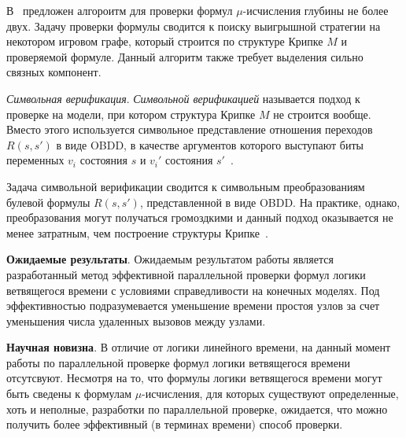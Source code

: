 \documentclass[a4paper,notitlepage,14pt]{article}
\begin{document}
В~\cite{Bollig_localparallel,Leucker_parallelmodel} предложен алгороитм для проверки
формул $\mu$-исчисления глубины не более двух. Задачу проверки формулы сводится к поиску
выигрышной стратегии на некотором игровом графе, который строится по структуре Крипке $M$
и проверяемой формуле. Данный алгоритм также требует выделения сильно связных компонент.

\textit{Символьная верификация}. \emph{Символьной верификацией} называется подход к
проверке на модели, при котором структура Крипке $M$ не строится вообще. Вместо этого
используется символьное представление отношения переходов $R(s, s')$ в виде OBDD, в
качестве аргументов которого выступают биты переменных $v_i$ состояния $s$ и $v_i'$
состояния $s'$~\cite{Clarke}.

Задача символьной верификации сводится к символьным преобразованиям булевой формулы $R(s,
s')$, представленной в виде OBDD. На практике, однако, преобразования могут получаться
громоздкими и данный подход оказывается не менее затратным, чем построение структуры
Крипке~\cite{Stern97parallelizingthe}.


\textbf{Ожидаемые результаты}. Ожидаемым результатом работы является разработанный метод
эффективной параллельной проверки формул логики ветвящегося времени с условиями
справедливости на конечных моделях. Под эффективностью подразумевается уменьшение времени
простоя узлов за счет уменьшения числа удаленных вызовов между узлами.

\textbf{Научная новизна}. В отличие от логики линейного времени, на данный момент работы
по параллельной проверке формул логики ветвящегося времени отсутсвуют. Несмотря на то, что
формулы логики ветвящегося времени могут быть сведены к формулам $\mu$-исчисления, для
которых существуют определенные, хоть и неполные, разработки по параллельной проверке,
ожидается, что можно получить более эффективный (в терминах времени) способ проверки.



\end{document}
